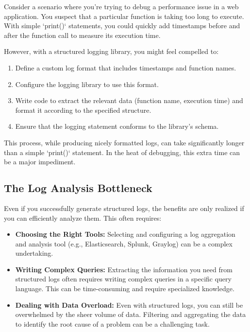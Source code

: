 \documentclass{article}
\begin{document}
{{{{Consider a scenario where you're trying to debug a performance issue in a web application. You suspect that a particular function is taking too long to execute. With simple `print()` statements, you could quickly add timestamps before and after the function call to measure its execution time.

However, with a structured logging library, you might feel compelled to:

\begin{enumerate}
    \item Define a custom log format that includes timestamps and function names.
    \item Configure the logging library to use this format.
    \item Write code to extract the relevant data (function name, execution time) and format it according to the specified structure.
    \item Ensure that the logging statement conforms to the library's schema.
\end{enumerate}

This process, while producing nicely formatted logs, can take significantly longer than a simple `print()` statement. In the heat of debugging, this extra time can be a major impediment.

\subsection*{The Log Analysis Bottleneck}

Even if you successfully generate structured logs, the benefits are only realized if you can efficiently analyze them. This often requires:

\begin{itemize}
    \item \textbf{Choosing the Right Tools:} Selecting and configuring a log aggregation and analysis tool (e.g., Elasticsearch, Splunk, Graylog) can be a complex undertaking.
    \item \textbf{Writing Complex Queries:} Extracting the information you need from structured logs often requires writing complex queries in a specific query language. This can be time-consuming and require specialized knowledge.
    \item \textbf{Dealing with Data Overload:} Even with structured logs, you can still be overwhelmed by the sheer volume of data. Filtering and aggregating the data to identify the root cause of a problem can be a challenging task.
\end{itemize}

}}}}
\end{document}
